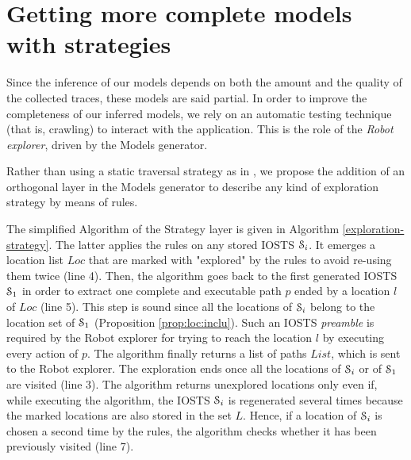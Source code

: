
\section{Getting more complete models with strategies}
\label{sec:modelinf:webapps:strategy}

Since the inference of our models depends on both the amount and
the quality of the collected traces, these models are said
partial. In order to improve the completeness of our inferred
models, we rely on an automatic testing technique (that is,
crawling) to interact with the application. This is the role of
the \emph{Robot explorer}, driven by the Models generator.

Rather than using a static traversal strategy as in
\cite{Memon:2003,concolicandroid12,crawljax:tweb12,
Amalfitano:2012:UGR:2351676.2351717, WPX13}, we propose the
addition of an orthogonal layer in the Models generator to
describe any kind of exploration strategy by means of rules.

The simplified Algorithm of the Strategy layer is given in
Algorithm \ref{exploration-strategy}. The latter applies the
rules on any stored IOSTS $\EuScript{S}_i$. It emerges a
location list $Loc$ that are marked with "explored" by the rules
to avoid re-using them twice (line 4). Then, the algorithm goes
back to the first generated IOSTS $\EuScript{S}_1$ in order to
extract one complete and executable path $p$ ended by a location
$l$ of $Loc$ (line 5). This step is sound since all the locations
of $\EuScript{S}_i$ belong to the location set of
$\EuScript{S}_1$ (Proposition \ref{prop:loc:inclu}). Such an
IOSTS \emph{preamble} is required by the Robot explorer for
trying to reach the location $l$ by executing every action of
$p$. The algorithm finally returns a list of paths $List$, which
is sent to the Robot explorer. The exploration ends once all the
locations of $\EuScript{S}_i$ or of $\EuScript{S}_1$ are visited
(line 3). The algorithm returns unexplored locations only even
if, while executing the algorithm, the IOSTS $\EuScript{S}_i$ is
regenerated several times because the marked locations are also
stored in the set $L$. Hence, if a location of $\EuScript{S}_i$
is chosen a second time by the rules, the algorithm checks
whether it has been previously visited (line 7).

